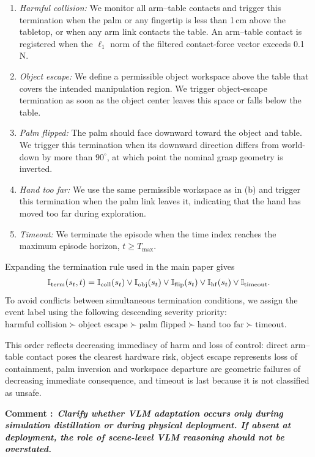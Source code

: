 \documentclass[12pt]{article}
\newcounter{reviewcomment}
\newcommand{\reviewcomment}[1]{%
  \refstepcounter{reviewcomment}
  \par\smallskip\noindent\textbf{Comment \thereviewcomment:}\
  \textbf{\itshape #1}\par
}
\begin{document}
\begingroup\footnotesize
\begin{enumerate}[label=(\alph*),leftmargin=2em,itemsep=2pt,topsep=3pt]
  \item \emph{Harmful collision:} We monitor all arm--table contacts and
  trigger this termination when the palm or any fingertip is less than
  1\,cm above the tabletop, or when any arm link contacts the table. An
  arm--table contact is registered when the $\ell_1$ norm of the filtered
  contact-force vector exceeds 0.1 N.
  \item \emph{Object escape:} We define a permissible object workspace above
  the table that covers the intended manipulation region. We trigger
  object-escape termination as soon as the object center leaves this space or
  falls below the table.
  \item \emph{Palm flipped:} The palm should face downward toward the object and
  table. We trigger this termination when its downward direction differs from
  world-down by more than $90^\circ$, at which point the nominal grasp geometry
  is inverted.
  \item \emph{Hand too far:} We use the same permissible workspace as in (b)
  and trigger this termination when the palm link leaves it, indicating that
  the hand has moved too far during exploration.
  \item \emph{Timeout:} We terminate the episode when the time index reaches
  the maximum episode horizon, $t\geq T_{\max}$.
\end{enumerate}
Expanding the termination rule used in the main paper gives
\[
\mathbb I_{\rm term}(s_t,t)
=\mathbb I_{\rm coll}(s_t)\lor\mathbb I_{\rm obj}(s_t)
 \lor\mathbb I_{\rm flip}(s_t)\lor\mathbb I_{\rm hf}(s_t)
 \lor\mathbb I_{\rm timeout}.
\]
\endgroup
To avoid conflicts between simultaneous termination conditions, we assign the
event label using the following descending severity priority:
$\text{harmful collision}\succ\text{object escape}\succ\text{palm flipped}
\succ\text{hand too far}\succ\text{timeout}$.

This order reflects decreasing immediacy of harm and loss of control: direct
arm--table contact poses the clearest hardware risk, object escape represents
loss of containment, palm inversion and workspace departure are geometric
failures of decreasing immediate consequence, and timeout is last because it is
not classified as unsafe.
\reviewcomment{Clarify whether VLM adaptation occurs only during simulation
distillation or during physical deployment. If absent at deployment, the role of
scene-level VLM reasoning should not be overstated.}
\end{document}
